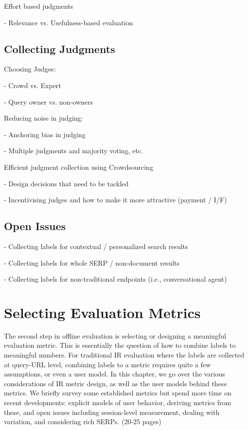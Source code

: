 \documentclass[openany]{now} %
\newcommand{\newpar}{\bigskip\noindent}
\begin{document}
\newpar
Effort based judgments \cite{Yilmaz:2014} \cite{Verma:2016:EBJ}

- Relevance vs. Usefulness-based evaluation 

\section{Collecting Judgments}

Choosing Judges: 

- Crowd vs. Expert \cite{Kazai:2013} \cite{Alonso20121053}

- Query owner vs. non-owners \cite{Chouldechova:2013}

\newpar
Reducing noise in judging: 

- Anchoring bias in judging \cite{Shokouhi:2015}

- Multiple judgments and majority voting, etc. \cite{Venanzi:2014}

\cite{aroyo2013measuring} \cite{aroyo2013crowd}

\newpar
Efficient judgment collection using Crowdsourcing

- Design decisions that need to be tackled  \cite{Blanco:2011} \cite{Kazai2012} \cite{Alonso2012} \cite{Alonso:2015} \cite{Scholer:2013} 

- Incentivising judges and how to make it more attractive (payment / I/F)
\cite{Megorskaya2015} \cite{Davtyan2015}  \cite{Rokicki:2014}  \cite{Eickhoff:2012}

\section{Open Issues}

- Collecting labels for contextual / personalized search results

- Collecting labels for whole SERP / non-document results

- Collecting labels for non-traditional endpoints (i.e., conversational agent)

\chapter{Selecting Evaluation Metrics}
\label{c-metrics}

The second step in offline evaluation is selecting or designing a meaningful evaluation metric. This is essentially the question of how to combine labels to meaningful numbers. For traditional IR evaluation where the labels are collected at query-URL level, combining labels to a metric requires quite a few assumptions, or even a user model. In this chapter, we go over the various considerations of IR metric design, as well as the user models behind these metrics. We briefly survey some established metrics but spend more time on recent developments: explicit models of user behavior, deriving metrics from these, and open issues including session-level measurement, dealing with variation, and considering rich SERPs. (20-25 pages)
\end{document}
